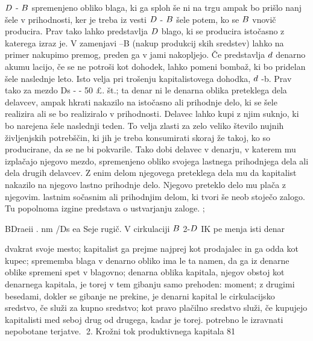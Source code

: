 \documentclass[kapital_02.tex]{subfiles}
\begin{document}
 \( D \) - \( B \) spremenjeno obliko blaga, ki ga sploh še ni na trgu ampak bo prišlo nanj šele v prihodnosti, ker je treba iz vesti \( D \) - \( B \) šele potem, ko se \( B \) vnovič producira. Prav tako lahko predstavlja \( D \) blago, ki se producira istočasno z katerega izraz je. V zamenjavi \KPED--B (nakup produkcij skih sredstev) lahko na primer nakupimo premog, preden ga v jami nakopljejo. Če predstavlja \( d \) denarno akumu lacijo, če se ne potroši kot dohodek, lahko pomeni bombaž, ki bo pridelan šele naslednje leto. Isto velja pri trošenju kapitalistovega dohodka, \( d \) -b. Prav tako za mezdo Ds - - 50 £. št.; ta denar ni le denarna oblika preteklega dela delavcev, ampak hkrati nakazilo na istočasno ali prihodnje delo, ki se šele realizira ali se bo realiziralo v prihodnosti. Delavec lahko kupi z njim suknjo, ki bo narejena šele naslednji teden. To velja zlasti za zelo veliko število nujnih življenjskih potrebščin, ki jih je treba konsumirati skoraj že takoj, ko so producirane, da se ne bi pokvarile. Tako dobi delavec v denarju, v katerem mu izplačajo njegovo mezdo, spremenjeno obliko svojega lastnega prihodnjega dela ali dela drugih delavcev. Z enim delom njegovega preteklega dela mu da kapitalist nakazilo na njegovo lastno prihodnje delo. Njegovo preteklo delo mu plača z njegovim. lastnim sočasnim ali prihodnjim delom, ki tvori še neob stoječo zalogo. Tu popolnoma izgine predstava o ustvarjanju zaloge. ;

BDraeii . nm /Ds ea Seje rugič. V cirkulaciji \( B \) 2-\( D \) IK pe menja isti denar

dvakrat svoje mesto; kapitalist ga prejme najprej kot prodajalec in ga odda kot kupec; sprememba blaga v denarno obliko ima le ta namen, da ga iz denarne oblike spremeni spet v blagovno; denarna oblika kapitala, njegov obstoj kot denarnega kapitala, je torej v tem gibanju samo prehoden: moment; z drugimi besedami, dokler se gibanje ne prekine, je denarni kapital le cirkulacijsko sredstvo, če služi za kupno sredstvo; kot pravo plačilno sredstvo služi, če kupujejo kapitalisti med seboj drug od drugega, kadar je torej. potrebno le izravnati nepobotane terjatve. 2. Krožni tok produktivnega kapitala 81
\end{document}
